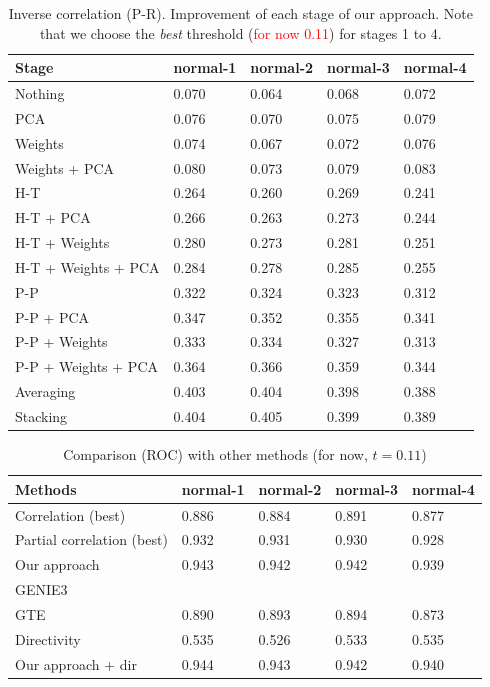 \documentclass[wcp]{jmlr}
\begin{document}
\begin{table}[htb]
\centering
\caption{Inverse correlation (P-R). Improvement of each stage of our approach. Note that we choose the
         \textit{best} threshold (\textcolor{red}{for now 0.11}) for stages 1 to 4.}
\begin{tabular}{*{5}{l}}
\toprule
Stage               & normal-1 & normal-2 & normal-3 & normal-4 \\
\midrule
Nothing             & 0.070 & 0.064 & 0.068 & 0.072\\
PCA                 & 0.076 & 0.070 & 0.075 & 0.079\\
Weights             & 0.074 & 0.067 & 0.072 & 0.076\\
Weights + PCA       & 0.080 & 0.073 & 0.079 & 0.083\\
H-T                 & 0.264 & 0.260 & 0.269 & 0.241\\
H-T + PCA           & 0.266 & 0.263 & 0.273 & 0.244\\
H-T + Weights       & 0.280 & 0.273 & 0.281 & 0.251\\
H-T + Weights + PCA & 0.284 & 0.278 & 0.285 & 0.255\\
P-P                 & 0.322 & 0.324 & 0.323 & 0.312\\
P-P + PCA           & 0.347 & 0.352 & 0.355 & 0.341\\
P-P + Weights       & 0.333 & 0.334 & 0.327 & 0.313\\
P-P + Weights + PCA & 0.364 & 0.366 & 0.359 & 0.344\\
Averaging           & 0.403 & 0.404 & 0.398 & 0.388\\
Stacking            & 0.404 & 0.405 & 0.399 & 0.389\\
\bottomrule
\end{tabular}
\end{table}


\begin{table}[H]
\centering
\caption{Comparison (ROC) with other methods (for now, $t = 0.11$)}
\begin{tabular}{*{5}{l}}
\toprule
Methods             & normal-1 & normal-2 & normal-3 & normal-4 \\
\midrule
Correlation (best)         & 0.886 & 0.884 & 0.891 & 0.877\\
Partial correlation (best) & 0.932 & 0.931 & 0.930 & 0.928 \\
Our approach               & 0.943 & 0.942 & 0.942 & 0.939 \\
GENIE3                     & & & & \\
GTE                        & 0.890 & 0.893 & 0.894 & 0.873 \\
Directivity                & 0.535 & 0.526 & 0.533 & 0.535 \\
Our approach + dir         & 0.944 & 0.943 & 0.942 & 0.940\\
\bottomrule
\end{tabular}
\end{table}
\end{document}
